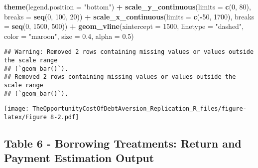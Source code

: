 \documentclass[
]{article}
\newenvironment{Shaded}{\begin{snugshade}}{\end{snugshade}}
\newcommand{\AttributeTok}[1]{\textcolor[rgb]{0.13,0.29,0.53}{#1}}
\newcommand{\DecValTok}[1]{\textcolor[rgb]{0.00,0.00,0.81}{#1}}
\newcommand{\FloatTok}[1]{\textcolor[rgb]{0.00,0.00,0.81}{#1}}
\newcommand{\FunctionTok}[1]{\textcolor[rgb]{0.13,0.29,0.53}{\textbf{#1}}}
\newcommand{\NormalTok}[1]{#1}
\newcommand{\SpecialCharTok}[1]{\textcolor[rgb]{0.81,0.36,0.00}{\textbf{#1}}}
\newcommand{\StringTok}[1]{\textcolor[rgb]{0.31,0.60,0.02}{#1}}
\begin{document}
\begin{Shaded}
\begin{Highlighting}[]
  \FunctionTok{theme}\NormalTok{(}\AttributeTok{legend.position =} \StringTok{"bottom"}\NormalTok{) }\SpecialCharTok{+}
  \FunctionTok{scale\_y\_continuous}\NormalTok{(}\AttributeTok{limits =} \FunctionTok{c}\NormalTok{(}\DecValTok{0}\NormalTok{, }\DecValTok{80}\NormalTok{), }\AttributeTok{breaks =} \FunctionTok{seq}\NormalTok{(}\DecValTok{0}\NormalTok{, }\DecValTok{100}\NormalTok{, }\DecValTok{20}\NormalTok{)) }\SpecialCharTok{+}
  \FunctionTok{scale\_x\_continuous}\NormalTok{(}\AttributeTok{limits =} \FunctionTok{c}\NormalTok{(}\SpecialCharTok{{-}}\DecValTok{50}\NormalTok{, }\DecValTok{1700}\NormalTok{), }\AttributeTok{breaks =} \FunctionTok{seq}\NormalTok{(}\DecValTok{0}\NormalTok{, }\DecValTok{1500}\NormalTok{, }\DecValTok{500}\NormalTok{)) }\SpecialCharTok{+}
  \FunctionTok{geom\_vline}\NormalTok{(}\AttributeTok{xintercept =} \DecValTok{1500}\NormalTok{, }\AttributeTok{linetype =} \StringTok{"dashed"}\NormalTok{, }\AttributeTok{color =} \StringTok{"maroon"}\NormalTok{, }\AttributeTok{size =} \FloatTok{0.4}\NormalTok{, }\AttributeTok{alpha =} \FloatTok{0.5}\NormalTok{)}
\end{Highlighting}
\end{Shaded}

\begin{verbatim}
## Warning: Removed 2 rows containing missing values or values outside the scale range
## (`geom_bar()`).
## Removed 2 rows containing missing values or values outside the scale range
## (`geom_bar()`).
\end{verbatim}

\texttt{[image: TheOpportunityCostOfDebtAversion\_Replication\_R\_files/figure-latex/Figure 8-2.pdf]}

\subsection{Table 6 - Borrowing Treatments: Return and Payment
Estimation
Output}\label{table-6---borrowing-treatments-return-and-payment-estimation-output}
\end{document}
